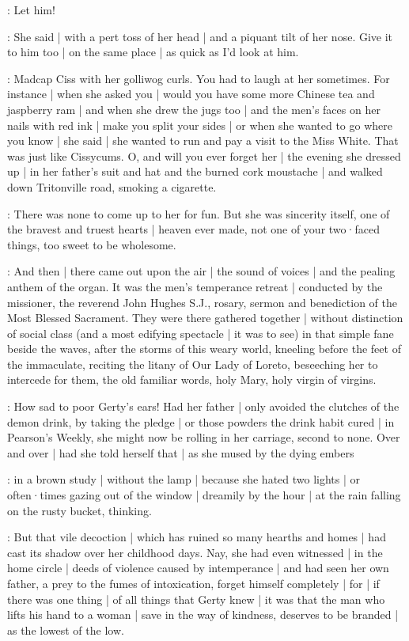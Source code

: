 \cissy:
Let him!

:
She said |
with a pert toss of her head |
and a piquant tilt of her nose.
Give it to him too |
on the same place |
as quick as I'd look at him.

\gertyReal:
Madcap Ciss with her golliwog curls.%
You had to laugh at her sometimes.
For instance |
when she asked you |
would you have some more Chinese tea and jaspberry ram |
and when she drew the jugs too |
and the men's faces on her nails with red ink |
make you split your sides |
or when she wanted to go where you know |
she said |
she wanted to run and pay a visit to the Miss White.
That was just like Cissycums.
O,
and will you ever forget her |
the evening she dressed up |
in her father's suit and hat and the burned cork moustache |
and walked down Tritonville road,
smoking a cigarette.

\gertyNovel:
There was none to come up to her for fun.
But she was sincerity itself,
one of the bravest and truest hearts |
heaven ever made,
not one of your two·faced things,%
too sweet to be wholesome.

\Nrelig:
And then |
there came out upon the air |
the sound of voices |
and the pealing anthem of the organ.
It was the men's temperance retreat |
conducted by the missioner,
the reverend John Hughes S.J.,
rosary, sermon and benediction
of the Most Blessed Sacrament.
They were there gathered together |
without distinction of social class
(and a most edifying spectacle |
it was to see)
in that simple fane beside the waves,
after the storms
of this weary world,
kneeling before the feet of the immaculate,
reciting the litany of Our Lady of Loreto,
beseeching her to intercede for them,
the old familiar words,
holy Mary,
holy virgin of virgins.

\gertyNovel:
How sad to poor Gerty's ears!%
Had her father |
only avoided the clutches of the demon drink,
by taking the pledge |
or those powders the drink habit cured |
in Pearson's Weekly,
she might now be rolling in her carriage,
second to none.
Over and over |
had she told herself that |
as she mused by the dying embers

\gertyReal:
in a brown study |
without the lamp |
because she hated two lights |
or often·times gazing out of the window |
dreamily by the hour |
at the rain falling on the rusty bucket,
thinking.

\gertyNovel:
But that vile decoction |
which has ruined so many hearths and homes |
had cast its shadow over her childhood days.
Nay,
she had even witnessed |
in the home circle |
deeds of violence
caused by intemperance |
and had seen her own father,
a prey to the fumes of intoxication,
forget himself completely |%
for |
if there was one thing |
of all things
that Gerty knew |
it was
that the man who lifts his hand to a woman |
save in the way of kindness,
deserves to be branded |
as the lowest of the low.

